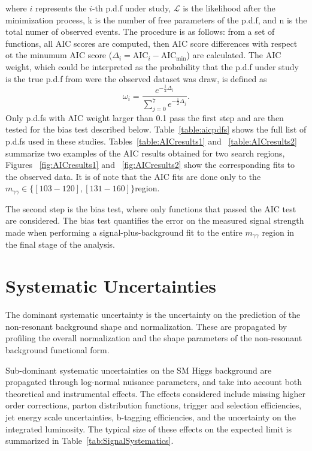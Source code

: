 where $i$ represents the $i$-th p.d.f under study, $\mathcal{L}$ is the likelihood after the minimization process,
k is the number of free parameters of the p.d.f, and n is the total
numer of observed events. The procedure is as follows: from a set of
functions, all AIC scores are computed, then AIC score differences
with respect ot the minumum AIC score
($\Delta_{i} = \mathrm{AIC}_{i} -\mathrm{AIC_{min}}$) are calculated.
The AIC weight, which could be interpreted as the probability that the
p.d.f under study is the true p.d.f from were the observed
dataset was draw, is defined as
\begin{equation}
\label{eq:AICweight}
\omega_{i} = \frac{e^{-\frac{1}{2}\Delta_{i}}}{\sum\limits_{j=0}^{7}e^{-\frac{1}{2}\Delta_{j}}}.
\end{equation}
Only p.d.fs with AIC weight larger than 0.1 pass the first step and
are then tested for the bias test described
below. Table~\ref{table:aicpdfs} shows the full list of p.d.fs used in
these studies. Tables~\ref{table:AICresults1} and
~\ref{table:AICresults2} summarize two examples of the AIC results
obtained for two search regions, Figures ~\ref{fig:AICresults1} and
~\ref{fig:AICresults2} show the corresponding fits to the observed
data. It is of note that the AIC fits are done only to the
$m_{\gamma\gamma}\in \{[103-120],[131-160]\}$\GeV region.

The second step is the bias test, where only functions that passed the
AIC test are considered. The bias test quantifies the error on the
measured signal strength made when
performing a signal-plus-background fit to the entire
$m_{\gamma\gamma}$ region in the final stage of the analysis.
\section{Systematic Uncertainties}\label{sec:systematics}

The dominant systematic uncertainty is the uncertainty on the prediction of the 
non-resonant background shape and normalization. These are propagated by
profiling the overall normalization and the shape parameters of the non-resonant
background functional form.

Sub-dominant systematic uncertainties on the SM Higgs background are propagated through
log-normal nuisance parameters, and take into account both theoretical and instrumental
effects. The effects considered include missing higher order corrections, 
parton distribution functions, trigger and selection efficiencies, jet energy scale uncertainties, 
b-tagging efficiencies, and the uncertainty on the integrated luminosity. The typical size of these 
effects on the expected limit is summarized in Table~\ref{tab:SignalSystematics}.

